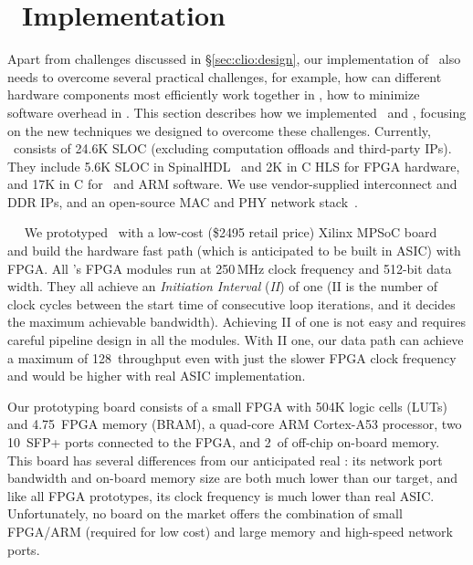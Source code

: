 \section{\sys\ Implementation}
\label{sec:clio:impl}

Apart from challenges discussed in \S\ref{sec:clio:design}, our implementation of \sys\ also needs to overcome several practical challenges, for example, how can different hardware components most efficiently work together in \sysboard, how to minimize software overhead in \syslib. 
This section describes how we implemented \sysboard\ and \syslib, focusing on the new techniques we designed to overcome these challenges.
Currently, \sys\ consists of 24.6K SLOC (excluding computation offloads and third-party IPs).
They include 5.6K SLOC in SpinalHDL~\cite{SpinalHDL} and 2K in C HLS for FPGA hardware, and 17K in C for \syslib\ and ARM software.
We use vendor-supplied interconnect and DDR IPs, and an open-source MAC and PHY network stack~\cite{Corundum-FCCM20}.

~~
We prototyped \sysboard\ with a low-cost (\$2495 retail price) Xilinx MPSoC board~\cite{ZCU106} and build the hardware fast path (which is anticipated to be built in ASIC) with FPGA.
All \sys's FPGA modules run at 250\,MHz clock frequency and 512-bit data width.
They all %
achieve an {\em Initiation Interval} ({\em II}) of one
(II is the number of clock cycles between the start time
of consecutive loop iterations, and it decides the maximum
achievable bandwidth). Achieving II of one is not easy and
requires careful pipeline design in all the modules. With II one, our data path can
achieve a maximum of 128\Gbps\ throughput even with just the slower FPGA clock frequency and would be higher with real ASIC implementation.

Our prototyping board consists of a small FPGA with 504K logic cells (LUTs) and 4.75\MB\ FPGA memory (BRAM),
a quad-core ARM Cortex-A53 processor,
two 10\Gbps\ SFP+ ports connected to the FPGA, 
and 2\GB\ of off-chip on-board memory.
This board has several differences from our anticipated real \sysboard:
its network port bandwidth and on-board memory size are both much lower than our target,
and like all FPGA prototypes, its clock frequency is much lower than real ASIC.
Unfortunately, no board on the market offers the combination of small FPGA/ARM (required for low cost) 
and large memory and high-speed network ports. %

